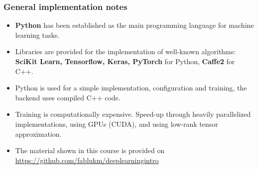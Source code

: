 \documentclass[10pt,hyperref={pdfpagelabels=false}]{beamer}
\begin{document}
\begin{frame}
\begin{minipage}{.4\textwidth}
    \end{minipage}
\end{frame}
\begin{frame}
    \frametitle{General implementation notes}
    \begin{itemize}
        \item {\bf Python} has been established as the main programming language for machine learning tasks.
        \item Libraries are provided for the implementation of well-known algorithms: {\bf SciKit Learn, Tensorflow, Keras, PyTorch} for Python, {\bf Caffe2} for C++.
        \item Python is used for a simple implementation, configuration and training, the backend uses compiled C++ code.
        \item Training is computationally expensive. Speed-up through heavily parallelized implementations, using GPUs (CUDA), and using low-rank tensor approximation.
        \item The material shown in this course is provided on
        \url{https://github.com/fablukm/deeplearningintro}
    \end{itemize}
\end{frame}
\end{document}
